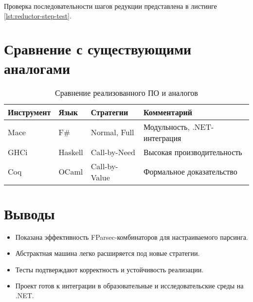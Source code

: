 Проверка последовательности шагов редукции представлена в листинге \ref{lst:reductor-step-test}.


\section{Сравнение с существующими аналогами}
\begin{table}[h]
\centering\small
\caption{Сравнение реализованного ПО и аналогов}
\begin{tabular}{|l|l|l|l|}
\hline
Инструмент & Язык    & Стратегии       & Комментарий                   \\ \hline
Mace       & F\#     & Normal, Full    & Модульность, .NET-интеграция \\ \hline
GHCi       & Haskell & Call-by-Need    & Высокая производительность    \\ \hline
Coq        & OCaml   & Call-by-Value   & Формальное доказательство     \\ \hline
\end{tabular}
\end{table}

\section{Выводы}
\begin{itemize}
  \item Показана эффективность FParsec-комбинаторов для настраиваемого парсинга.
  \item Абстрактная машина легко расширяется под новые стратегии.
  \item Тесты подтверждают корректность и устойчивость реализации.
  \item Проект готов к интеграции в образовательные и исследовательские среды на .NET.
\end{itemize}
